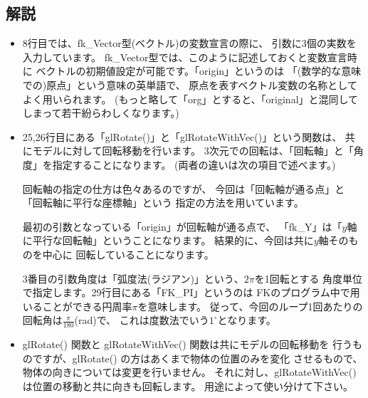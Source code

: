 \subsection*{解説}
\begin{itemize}
 \item 8行目では、fk\_Vector型(ベクトル)の変数宣言の際に、
	引数に3個の実数を入力しています。
	fk\_Vector型では、このように記述しておくと変数宣言時に
	ベクトルの初期値設定が可能です。「origin」というのは
	「(数学的な意味での)原点」という意味の英単語で、
	原点を表すベクトル変数の名称としてよく用いられます。
	(もっと略して「org」とすると、「original」と混同して
	しまって若干紛らわしくなります。)

 \item 25,26行目にある「glRotate()」と「glRotateWithVec()」という関数は、
	共にモデルに対して回転移動を行います。
	3次元での回転は、「回転軸」と「角度」を指定することになります。
	(両者の違いは次の項目で述べます。)

	回転軸の指定の仕方は色々あるのですが、
	今回は「回転軸が通る点」と「回転軸に平行な座標軸」という
	指定の方法を用いています。

	最初の引数となっている「origin」が回転軸が通る点で、
	「fk\_Y」は「\(y\)軸に平行な回転軸」ということになります。
	結果的に、今回は共に\(y\)軸そのものを中心に
	回転していることになります。

	3番目の引数角度は「弧度法(ラジアン)」という、\(2\pi\)を1回転とする
	角度単位で指定します。29行目にある「FK\_PI」というのは
	FKのプログラム中で用いることができる円周率\(\pi\)を意味します。
	従って、今回のループ1回あたりの回転角は\(\frac{\pi}{180}\)(rad)で、
	これは度数法でいう\(1^{\circ}\)となります。

 \item glRotate() 関数と glRotateWithVec() 関数は共にモデルの回転移動を
	行うものですが、glRotate() の方はあくまで物体の位置のみを変化
	させるもので、物体の向きについては変更を行いません。
	それに対し、glRotateWithVec() は位置の移動と共に向きも回転します。
	用途によって使い分けて下さい。

\end{itemize}

